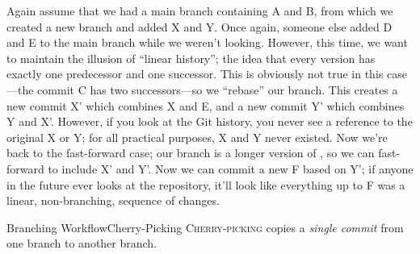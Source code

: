 Again assume that we had a main branch containing A and B, from which we
created a new branch and added X and Y.  Once again, someone else added D and E
to the main branch while we weren't looking.  However, this time, we want to
maintain the illusion of \enquote{linear history}; the idea that every version
has exactly one predecessor and one successor.  This is obviously not true in
this case---the commit C has two successors---so we \enquote{rebase} our
branch.  This creates a new commit X' which combines X and E, and a new commit
Y' which combines Y and X'.  However, if you look at the Git history, you never
see a reference to the original X or Y; for all practical purposes, X and Y
never existed.  Now we're back to the fast-forward case; our branch is a longer
version of , so we can fast-forward  to include X' and Y'.
Now we can commit a new F based on Y'; if anyone in the future ever looks at
the repository, it'll look like everything up to F was a linear, non-branching,
sequence of changes.


\begin{frame}{Branching Workflow}{Cherry-Picking}
  \textsc{Cherry-picking} copies a \textit{single commit} from one branch to
  another branch. %
  \begin{center}
  \end{center}
\end{frame}

